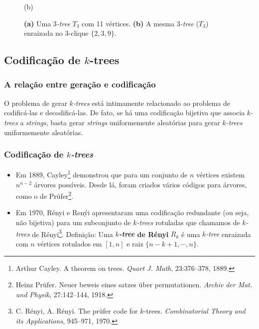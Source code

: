 \documentclass{beamer}
\begin{document}
\begin{frame}
\begin{figure}
\begin{minipage}{0.5\textwidth}
{
        }

        (b)
      \end{minipage}

      \caption{
        \textbf{(a)} Uma \emph{$3$-tree} $T_3$ com 11 vértices.
        \textbf{(b)} A mesma \emph{$3$-tree} ($T_3$) enraizada no $3$-clique $\{2, 3, 9\}$.
      }
      \label{fig:rootedktree}
    \end{figure}
  \end{frame}


  \subsection{Codificação de $k$-trees}

  \begin{frame}
    \frametitle{A relação entre geração e codificação}

    O problema de gerar \emph{$k$-trees} está intimamente relacionado ao problema de codificá-las e decodificá-las. De fato, se há uma codificação bijetiva que associa \emph{$k$-trees} a \emph{strings}, basta gerar \emph{strings} uniformemente aleatórias para gerar \emph{$k$-trees} uniformemente aleatórias.
  \end{frame}

  \begin{frame}
    \frametitle{Codificação de \emph{$k$-trees}}

    \begin{itemize}
      \item Em 1889, Cayley\footnote{\scriptsize Arthur Cayley. A theorem on trees. \emph{Quart J. Math}, 23:376--378, 1889.} demonstrou que para um conjunto de $n$ vértices existem $n^{n-2}$ árvores possíveis. Desde lá, foram criados vários códigos para árvores, como o de Prüfer\footnote{\scriptsize Heinz Prüfer. Neuer beweis eines satzes über permutationen. \emph{Archiv der Mat. und Physik}, 27:142--144, 1918.}.
      \item Em 1970, Rényi e Renýi apresentaram uma codificação redundante (ou seja, não bijetiva) para um subconjunto de \emph{$k$-trees} rotuladas que chamamos de \emph{$k$-trees} de Rényi\footnote{\scriptsize C. Rényi, A. Rényi. The prüfer code for $k$-trees. \emph{Combinatorial Theory and its Applications}, 945--971, 1970.}. Definição: Uma \textbf{\emph{$k$-tree} de Rényi} $R_k$ é uma \emph{$k$-tree} enraizada com $n$ vértices rotulados em $[1, n]$ e raiz $\{n-k+1, \cdots, n\}$.
    \end{itemize}
  \end{frame}
\end{document}
